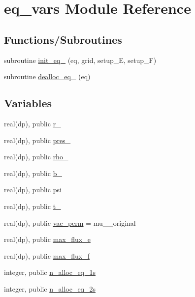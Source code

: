 \hypertarget{namespaceeq__vars}{}\section{eq\+\_\+vars Module Reference}
\label{namespaceeq__vars}
\subsection*{Functions/\+Subroutines}
\begin{DoxyCompactItemize}
\item 
subroutine \hyperlink{namespaceeq__vars_a93947b772250ef73b25bde7688b33bc2}{init\+\_\+eq\+\_} (eq, grid, setup\+\_\+E, setup\+\_\+F)
\item 
subroutine \hyperlink{namespaceeq__vars_ab106dc007ddc896092d0464233b3ce12}{dealloc\+\_\+eq\+\_} (eq)
\end{DoxyCompactItemize}
\subsection*{Variables}
\begin{DoxyCompactItemize}
\item 
real(dp), public \hyperlink{namespaceeq__vars_a0c1f124ab3260a0f6937df9189a18184}{r\+\_}
\item 
real(dp), public \hyperlink{namespaceeq__vars_abce8bbe23c333a591a2ee5cef9512de9}{pres\+\_}
\item 
real(dp), public \hyperlink{namespaceeq__vars_a8c9bdb18a418329b9be241342ea704e3}{rho\+\_}
\item 
real(dp), public \hyperlink{namespaceeq__vars_acdd2464f2282359a818e4159b502e84b}{b\+\_}
\item 
real(dp), public \hyperlink{namespaceeq__vars_a2bb2594492faa83869c3eaf8cabe521e}{psi\+\_}
\item 
real(dp), public \hyperlink{namespaceeq__vars_a5170d0b84bb0faf24d5fdcf7c9371620}{t\+\_}
\item 
real(dp), public \hyperlink{namespaceeq__vars_ac45a3781896236d8c8fe95d920f7337c}{vac\+\_\+perm} = mu\+\_\+\_\+original
\item 
real(dp), public \hyperlink{namespaceeq__vars_a863feef76ae60309d2e3ed4eed6bd436}{max\+\_\+flux\+\_\+e}
\item 
real(dp), public \hyperlink{namespaceeq__vars_a46c97bf2a6d6eca952ca5173fcf9cdcb}{max\+\_\+flux\+\_\+f}
\item 
integer, public \hyperlink{namespaceeq__vars_aed1853ac20f0da0be39ab8ef82993c4d}{n\+\_\+alloc\+\_\+eq\+\_\+1s}
\item 
integer, public \hyperlink{namespaceeq__vars_af75297445b32de13371da989074dd454}{n\+\_\+alloc\+\_\+eq\+\_\+2s}
\end{DoxyCompactItemize}


